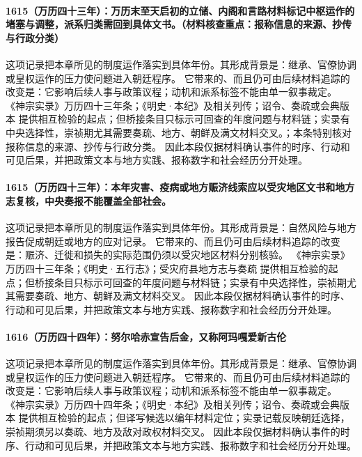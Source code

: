 \paragraph{1615（万历四十三年）：万历末至天启初的立储、内阁和言路材料标记中枢运作的堵塞与调整，派系归类需回到具体文书。（材料核查重点：报称信息的来源、抄传与行政分类）} 这项记录把本章所见的制度运作落实到具体年份。其形成背景是：继承、官僚协调或皇权运作的压力使问题进入朝廷程序。 它带来的、而且仍可由后续材料追踪的改变是：它影响后续人事与政策议程；动机和派系标签不能由单一叙事裁定。 《神宗实录》万历四十三年条；《明史·本纪》及相关列传；诏令、奏疏或会典版本 提供相互检验的起点；但桥接条目只标示可回查的年度问题与材料链；实录有中央选择性，崇祯期尤其需要奏疏、地方、朝鲜及满文材料交叉。；本条特别核对报称信息的来源、抄传与行政分类。 因此本段仅据材料确认事件的时序、行动和可见后果，并把政策文本与地方实践、报称数字和社会经历分开处理。

\paragraph{1615（万历四十三年）：本年灾害、疫病或地方赈济线索应以受灾地区文书和地方志复核，中央奏报不能覆盖全部社会。} 这项记录把本章所见的制度运作落实到具体年份。其形成背景是：自然风险与地方报告促成朝廷或地方的应对记录。 它带来的、而且仍可由后续材料追踪的改变是：赈济、迁徙和损失的实际范围仍须以受灾地区材料分别核验。 《神宗实录》万历四十三年条；《明史·五行志》；受灾府县地方志与奏疏 提供相互检验的起点；但桥接条目只标示可回查的年度问题与材料链；实录有中央选择性，崇祯期尤其需要奏疏、地方、朝鲜及满文材料交叉。 因此本段仅据材料确认事件的时序、行动和可见后果，并把政策文本与地方实践、报称数字和社会经历分开处理。

\paragraph{1616（万历四十四年）：努尔哈赤宣告后金，又称阿玛嘎爱新古伦} 这项记录把本章所见的制度运作落实到具体年份。其形成背景是：继承、官僚协调或皇权运作的压力使问题进入朝廷程序。 它带来的、而且仍可由后续材料追踪的改变是：它影响后续人事与政策议程；动机和派系标签不能由单一叙事裁定。 《神宗实录》万历四十四年条；《明史·本纪》及相关列传；诏令、奏疏或会典版本 提供相互检验的起点；但译写候选以编年材料定位；实录记载反映朝廷选择，崇祯期须另以奏疏、地方及敌对政权材料交叉。 因此本段仅据材料确认事件的时序、行动和可见后果，并把政策文本与地方实践、报称数字和社会经历分开处理。

